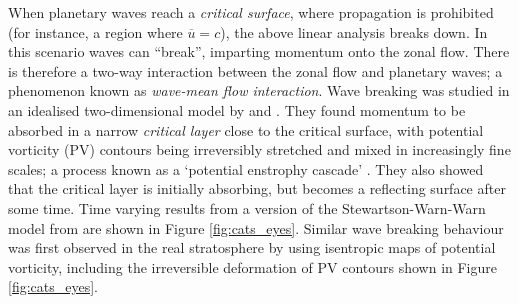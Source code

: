 \bigskip When planetary waves reach a \emph{critical surface}, where propagation
is prohibited (for instance, a region where $\overline{u} = c$), the above
linear analysis breaks down. In this scenario waves can ``break'', imparting
momentum onto the zonal flow. There is therefore a two-way interaction between
the zonal flow and planetary waves; a phenomenon known as \emph{wave-mean flow
  interaction}. Wave breaking was studied in an idealised two-dimensional model
by \citet{Stewartson1978} and \citet{Warn1978}. They found momentum to be
absorbed in a narrow \emph{critical layer} close to the critical surface, with
potential vorticity (PV) contours being irreversibly stretched and mixed in
increasingly fine scales; a process known as a `potential enstrophy cascade'
\citep[e.g.,][]{Rhines1979}. They also showed that the critical layer is
initially absorbing, but becomes a reflecting surface after some time. Time
varying results from a version of the Stewartson-Warn-Warn model from
\citet{Andrews1987} are shown in Figure \ref{fig:cats_eyes}. Similar wave
breaking behaviour was first observed in the real stratosphere by
\citet{McIntyre1983} using isentropic maps of potential vorticity, including the
irreversible deformation of PV contours shown in Figure \ref{fig:cats_eyes}.


